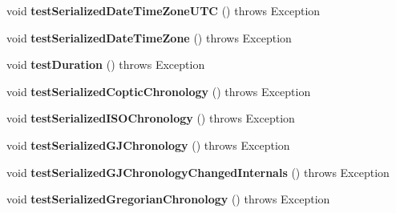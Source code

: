 \begin{DoxyCompactItemize}
\item 
\hypertarget{classorg_1_1joda_1_1time_1_1_test_serialization_a6fb5979d3fbc71b6077dfc051ed48b4c}{void {\bfseries test\-Serialized\-Date\-Time\-Zone\-U\-T\-C} ()  throws Exception }\label{classorg_1_1joda_1_1time_1_1_test_serialization_a6fb5979d3fbc71b6077dfc051ed48b4c}

\item 
\hypertarget{classorg_1_1joda_1_1time_1_1_test_serialization_a7d73147a3871c7b59c50ce8b42904455}{void {\bfseries test\-Serialized\-Date\-Time\-Zone} ()  throws Exception }\label{classorg_1_1joda_1_1time_1_1_test_serialization_a7d73147a3871c7b59c50ce8b42904455}

\item 
\hypertarget{classorg_1_1joda_1_1time_1_1_test_serialization_aadfc3e7c5c38472cc5f26568bf94a347}{void {\bfseries test\-Duration} ()  throws Exception }\label{classorg_1_1joda_1_1time_1_1_test_serialization_aadfc3e7c5c38472cc5f26568bf94a347}

\item 
\hypertarget{classorg_1_1joda_1_1time_1_1_test_serialization_a145ca398c2c79a04a932db3675e0112d}{void {\bfseries test\-Serialized\-Coptic\-Chronology} ()  throws Exception }\label{classorg_1_1joda_1_1time_1_1_test_serialization_a145ca398c2c79a04a932db3675e0112d}

\item 
\hypertarget{classorg_1_1joda_1_1time_1_1_test_serialization_a41eaa8eceed64bbad0b82cd282e6fac5}{void {\bfseries test\-Serialized\-I\-S\-O\-Chronology} ()  throws Exception }\label{classorg_1_1joda_1_1time_1_1_test_serialization_a41eaa8eceed64bbad0b82cd282e6fac5}

\item 
\hypertarget{classorg_1_1joda_1_1time_1_1_test_serialization_aced1ff5138ecf85838865817b76cbcb8}{void {\bfseries test\-Serialized\-G\-J\-Chronology} ()  throws Exception }\label{classorg_1_1joda_1_1time_1_1_test_serialization_aced1ff5138ecf85838865817b76cbcb8}

\item 
\hypertarget{classorg_1_1joda_1_1time_1_1_test_serialization_ab8e58d57899f28d4706043e4e6639e42}{void {\bfseries test\-Serialized\-G\-J\-Chronology\-Changed\-Internals} ()  throws Exception }\label{classorg_1_1joda_1_1time_1_1_test_serialization_ab8e58d57899f28d4706043e4e6639e42}

\item 
\hypertarget{classorg_1_1joda_1_1time_1_1_test_serialization_a7e3136cdc8610204228cf962c78c6baf}{void {\bfseries test\-Serialized\-Gregorian\-Chronology} ()  throws Exception }\label{classorg_1_1joda_1_1time_1_1_test_serialization_a7e3136cdc8610204228cf962c78c6baf}


\end{DoxyCompactItemize}
